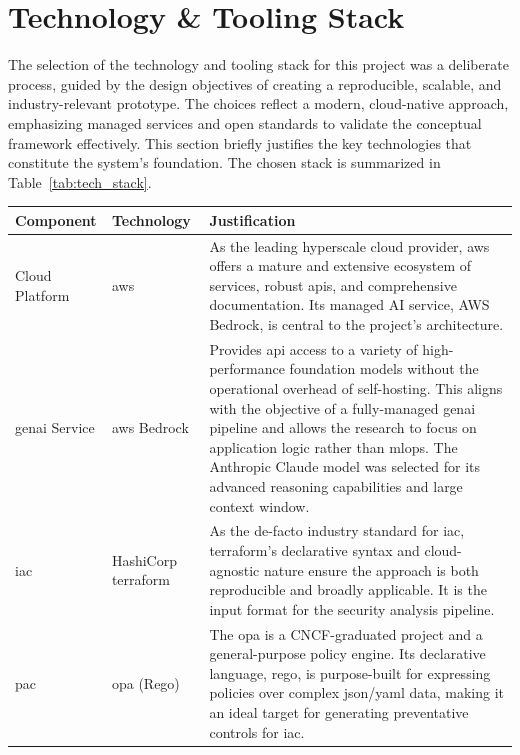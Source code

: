 \section{Technology \& Tooling Stack}

The selection of the technology and tooling stack for this project was a deliberate process, guided by the design objectives of creating a reproducible, scalable, and industry-relevant prototype. The choices reflect a modern, \gls{cloud-native} approach, emphasizing managed services and open standards to validate the conceptual framework effectively. This section briefly justifies the key technologies that constitute the system's foundation. The chosen stack is summarized in Table~\ref{tab:tech_stack}.

\begin{center}
\begin{tabular}{|l|l|p{7cm}|}
\hline
\textbf{Component} & \textbf{Technology} & \textbf{Justification} \\
\hline
Cloud Platform & \gls{aws} & As the leading hyperscale cloud provider, \gls{aws} offers a mature and extensive ecosystem of services, robust \gls{api}s, and comprehensive documentation. Its managed AI service, AWS Bedrock, is central to the project's architecture. \\
\hline
\gls{genai} Service & \gls{aws} Bedrock \cite{noauthor_claude_nodate} & Provides \gls{api} access to a variety of high-performance foundation models without the operational overhead of self-hosting. This aligns with the objective of a fully-managed \gls{genai} pipeline and allows the research to focus on application logic rather than \gls{mlops}. The Anthropic Claude model was selected for its advanced reasoning capabilities and large context window. \\
\hline
\gls{iac} & HashiCorp \gls{terraform} \cite{noauthor_terraform_nodate} & As the de-facto industry standard for \gls{iac}, \gls{terraform}'s declarative syntax and cloud-agnostic nature ensure the approach is both reproducible and broadly applicable. It is the input format for the security analysis pipeline. \\
\hline
\gls{pac} & \gls{opa} (Rego) \cite{noauthor_introduction_nodate} & The \gls{opa} is a CNCF-graduated project and a general-purpose policy engine. Its declarative language, \gls{rego}, is purpose-built for expressing policies over complex \gls{json}/\gls{yaml} data, making it an ideal target for generating preventative controls for \gls{iac}. \\

\end{tabular}
\end{center}
